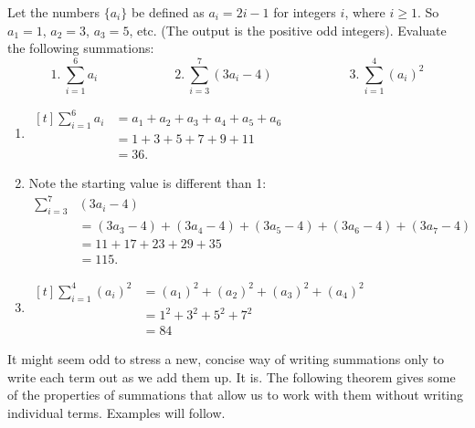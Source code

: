 \begin{example}\label{ex_rie3}%
Let the numbers $\{a_i\}$ be defined as $a_i = 2i-1$ for integers $i$, where $i\geq 1$. So $a_1 = 1$, $a_2 = 3$, $a_3 = 5$, etc. (The output is the positive odd integers). Evaluate the following summations:
\[ 1.\ \sum_{i=1}^6 a_i \qquad\qquad\qquad 2.\ \sum_{i=3}^7 (3a_i-4)\qquad\qquad \qquad 3.\ \sum_{i=1}^4 (a_i)^2\]
\solution
\begin{enumerate}
	\item \hfill$\begin{aligned}[t]
			\sum_{i=1}^6 a_i &= a_1+a_2+a_3+a_4+a_5+a_6\\
			&=	1+3+5+7+9+11 \\
			&=	36.
		\end{aligned}$\hfill\null
	\item	Note the starting value is different than 1:
		\begin{align*}
			\sum_{i=3}^7 &(3a_i-4)\\
			&= (3a_3-4)+(3a_4-4)+(3a_5-4)+(3a_6-4)+(3a_7-4) \\
			&= 11+17+23+29+35 \\
			&= 115.
		\end{align*}
	\item \hfill$\begin{aligned}[t]
			\sum_{i=1}^4 (a_i)^2 &=	(a_1)^2+(a_2)^2+(a_3)^2+(a_4)^2\\
			&=	1^2+3^2+5^2+7^2 \\
			&=	84
		\end{aligned}$\hfill\null
\end{enumerate}
\end{example}

It might seem odd to stress a new, concise way of writing summations only to write each term out as we add them up. It is. The following theorem gives some of the properties of summations that allow us to work with them without writing individual terms. Examples will follow.

